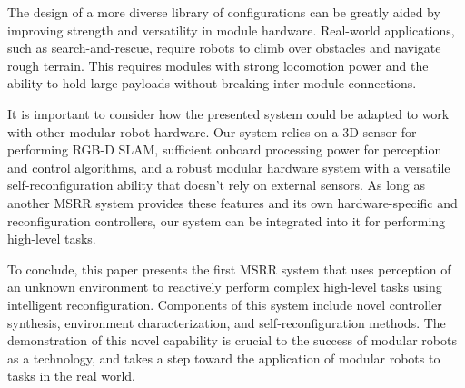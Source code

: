 \documentclass[conference]{IEEEtran}
\begin{document}
The design of a more diverse library of configurations can be greatly aided by improving strength and versatility in module hardware. Real-world applications, such as search-and-rescue, require robots to climb over obstacles and navigate rough terrain. This requires modules with strong locomotion power and the ability to hold large payloads without breaking inter-module connections.

It is important to consider how the presented system could be adapted to work with other modular robot hardware. Our system relies on a 3D sensor for performing RGB-D SLAM, sufficient onboard processing power for perception and control algorithms, and a robust modular hardware system with a versatile self-reconfiguration ability that doesn't rely on external sensors. As long as another MSRR system provides these features and its own hardware-specific and reconfiguration controllers, our system can be integrated into it for performing high-level tasks.

To conclude, this paper presents the first MSRR system that uses perception of an unknown environment to reactively perform complex high-level tasks using intelligent reconfiguration. Components of this system include novel controller synthesis, environment characterization, and self-reconfiguration methods. The demonstration of this novel capability is crucial to the success of modular robots as a technology, and takes a step toward the application of modular robots to tasks in the real world.
%
%





\end{document}
